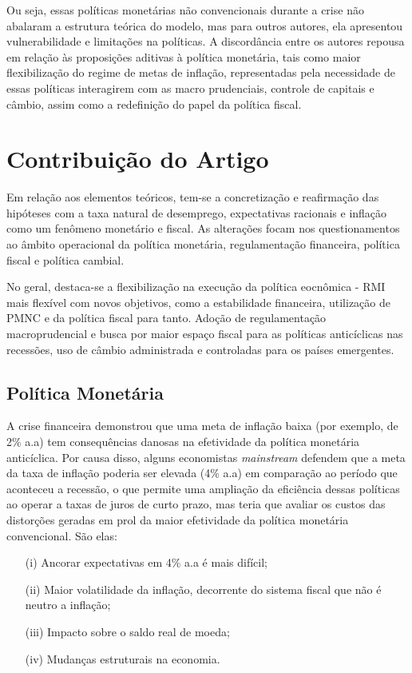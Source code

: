 \documentclass[report]{uftex}
\begin{document}
Ou seja, essas políticas monetárias não convencionais durante a crise não abalaram a estrutura teórica do modelo, mas para outros autores, ela apresentou vulnerabilidade e limitações na políticas. A discordância entre os autores repousa em relação às proposições aditivas à política monetária, tais como maior flexibilização do regime de metas de inflação, representadas pela necessidade de essas políticas interagirem com as macro prudenciais, controle de capitais e câmbio, assim como a redefinição  do papel da política fiscal.

\section{Contribuição do Artigo}

Em relação aos elementos teóricos, tem-se a concretização e reafirmação das hipóteses com a taxa natural de desemprego, expectativas racionais e inflação como um fenômeno monetário e fiscal. As alterações focam nos questionamentos ao âmbito operacional da política monetária, regulamentação financeira, política fiscal e política cambial. 

No geral, destaca-se a flexibilização na execução da política eocnômica - RMI mais flexível com novos objetivos, como a estabilidade financeira, utilização de PMNC e da política fiscal para tanto. Adoção de regulamentação macroprudencial e busca por maior espaço fiscal para as políticas anticíclicas nas recessões, uso de câmbio administrada e controladas para os países emergentes.

\subsection{Política Monetária}

A crise financeira demonstrou que uma meta de inflação baixa (por exemplo, de 2\% a.a) tem consequências danosas na efetividade da política monetária anticíclica. Por causa disso, alguns economistas \textit{mainstream} defendem que a meta da taxa de inflação poderia ser elevada (4\% a.a) em comparação ao período que aconteceu a recessão, o que permite uma ampliação da eficiência dessas políticas ao operar a taxas de juros de curto prazo, mas teria que avaliar os custos das distorções geradas em prol da maior efetividade da política monetária convencional. São elas: 

\begin{itemize}
	\item[(i)] Ancorar expectativas em 4\% a.a é mais difícil;
	\item[(ii)] Maior volatilidade da inflação, decorrente do sistema fiscal que não é neutro a inflação;
	\item[(iii)] Impacto sobre o saldo real de moeda;
	\item[(iv)] Mudanças estruturais na economia.
\end{itemize}
\end{document}
